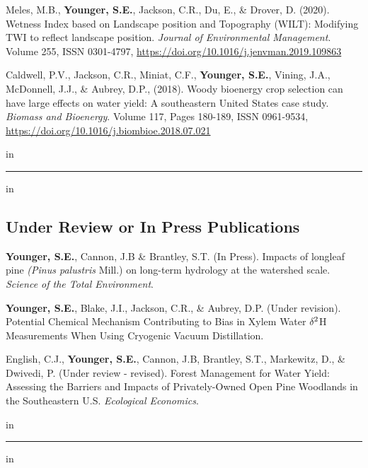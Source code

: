 \documentclass[10pt,letterpaper]{article}
\begin{document}
\begin{hangparas}{.25in}{1}
		Meles, M.B., \textbf{Younger, S.E.}, Jackson, C.R., Du, E., \& Drover, D. (2020). Wetness Index based on Landscape position and Topography (WILT): Modifying TWI to reflect landscape position. \textit{Journal of Environmental Management}. Volume 255, ISSN 0301-4797, \url{https://doi.org/10.1016/j.jenvman.2019.109863}
		
		Caldwell, P.V., Jackson, C.R., Miniat, C.F., \textbf{Younger, S.E.}, Vining, J.A., McDonnell, J.J., \& Aubrey, D.P., (2018). Woody bioenergy crop selection can have large effects on water yield: A southeastern United States case study.
		\textit{Biomass and Bioenergy}. Volume 117, Pages 180-189, ISSN 0961-9534, \url{https://doi.org/10.1016/j.biombioe.2018.07.021}
		
		 in
		\vspace{-0.4em}
		
	\end{hangparas}

\newpage

\hrule
\vspace{-0.4em}
 in
\subsection*{Under Review or In Press Publications}

\begin{hangparas}{.25in}{1}
	
	\textbf{Younger, S.E.}, Cannon, J.B \& Brantley, S.T. (In Press). Impacts of longleaf pine \textit{(Pinus palustris} Mill.) on long-term hydrology at the watershed scale. \textit{Science of the Total Environment}.
	
	\textbf{Younger, S.E.}, Blake, J.I., Jackson, C.R., \& Aubrey, D.P. (Under revision). Potential Chemical Mechanism Contributing to Bias in Xylem Water $\delta$$\textsuperscript{2}$H Measurements When Using Cryogenic Vacuum Distillation.
	
	English, C.J., \textbf{Younger, S.E.}, Cannon, J.B, Brantley, S.T., Markewitz, D., \& Dwivedi, P. (Under review - revised). Forest Management for Water Yield: Assessing the Barriers and Impacts of Privately-Owned Open Pine Woodlands in the Southeastern U.S. \textit{Ecological Economics}.
	
	 in
	\vspace{-0.4em}
	
\end{hangparas}
	
	\hrule
	\vspace{-0.4em}
	 in
\end{document}

